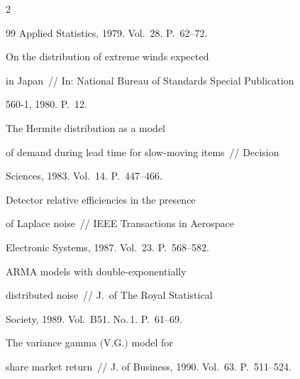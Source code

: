 \begin{multicols}{2}
{{\begin{thebibliography}{99}
Applied Statistics, 1979. Vol.~28. P.~62--72.









On the distribution of extreme winds expected


in Japan~// In: National Bureau of Standards Special Publication


560-1, 1980. P.~12.









The Hermite distribution as a model


of demand during lead time for slow-moving items~// Decision


Sciences, 1983. Vol.~14. P.~447--466.









Detector relative efficiencies in the presence


of Laplace noise~// IEEE Transactions in Aerospace


Electronic Systems, 1987. Vol.~23. P.~568--582.









ARMA models with double-exponentially


distributed noise~// J.\ of The Royal Statistical


Society, 1989. Vol.~B51. No.\,1. P.~61--69.









The variance gamma $($V.G.$)$ model for


share market return~// J. of Business, 1990. Vol.~63. P.~511--524.










\end{thebibliography}}}
\end{multicols}
